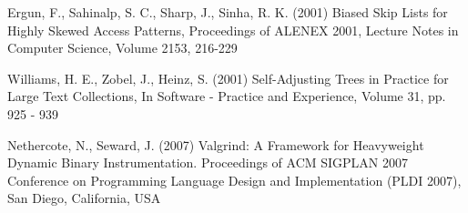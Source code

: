 \documentclass[mcs]{scsthesis}
\begin{document}
\begin{thebibliography}{5}
Ergun, F., Sahinalp, S. C., Sharp, J., Sinha, R. K. (2001) Biased Skip Lists
for Highly Skewed Access Patterns, Proceedings of ALENEX 2001, Lecture Notes in
Computer Science, Volume 2153, 216-229

Williams, H. E., Zobel, J., Heinz, S. (2001) Self-Adjusting Trees in Practice
for Large Text Collections, In Software - Practice and Experience,
Volume 31, pp. 925 - 939

Nethercote, N., Seward, J. (2007) Valgrind: A Framework for Heavyweight Dynamic
Binary Instrumentation.  Proceedings of ACM SIGPLAN 2007 Conference on
Programming Language Design and Implementation (PLDI 2007),
San Diego, California, USA

\end{thebibliography}
\end{document}
